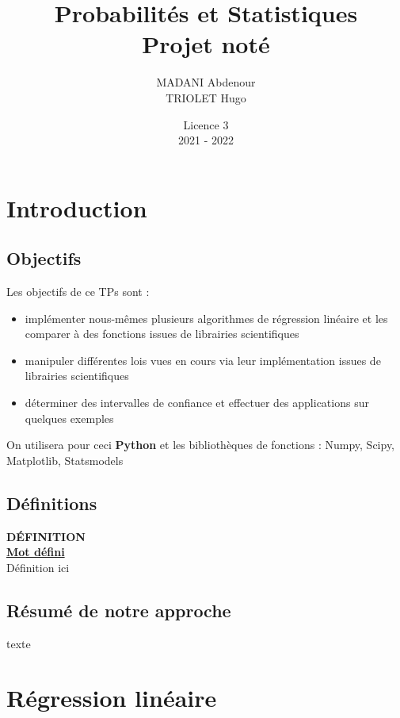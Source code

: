 \documentclass{article}      %
\title{Probabilités et Statistiques\\\Large{Projet noté}}
\author{MADANI Abdenour\\TRIOLET Hugo}
\date{Licence 3\\2021 - 2022}
\begin{document}
\normalsize
\maketitle

\renewcommand*\contentsname{Table des matières}
\tableofcontents
\newpage



\section{Introduction}
\subsection{Objectifs}
Les objectifs de ce TPs sont :
\begin{itemize}
  \item implémenter nous-mêmes plusieurs algorithmes de régression linéaire et les comparer à des fonctions issues de librairies scientifiques
  \item manipuler différentes lois vues en cours via leur implémentation issues de librairies scientifiques
  \item déterminer des intervalles de confiance et effectuer des applications sur quelques exemples
\end{itemize}

On utilisera pour ceci \textbf{Python} et les bibliothèques de fonctions : Numpy, Scipy, Matplotlib, Statsmodels



\subsection{Définitions}
\begin{definition}
{ \scriptsize \textcolor{definition}{ \textbf{DÉFINITION}}}
\vspace{3px}
\\ \underline{\textbf{Mot défini}}
\vspace{2.5px}
\\ Définition ici
\end{definition}


\subsection{Résumé de notre approche}
texte


\section{Régression linéaire}
\end{document}
